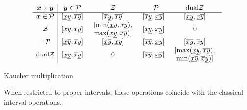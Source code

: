 \documentclass{sig-alternate-05-2015} %
\newcommand{\pro}{\mbox{pro }}
\def\K{{\Bbb I \Bbb K}}
\begin{document}
\begin{table}
\captionsetup{singlelinecheck=off}
\[
\begin{array}{c|cccc}
\x \times \y & \y \in \cal P & \cal Z & - \cal P & \mbox{dual} \cal Z \\
\hline
\x \in \cal P & [\underline x \underline y, \overline x \overline y] & [\overline x \underline y,
\overline x \overline y] & [\overline x \underline y,\underline x \overline y] & 
[\underline x \underline y, \underline x \overline y] \\
\cal Z & [\underline x \overline y, \overline x \overline y] & 
\begin{array}{c}[\min(\underline x \overline y,
\overline x \underline y), \\  \max(\underline x \underline y, \overline x \overline y)]
\end{array}  & 
 [\overline x \underline y, \underline x \underline y]  & 0 \\
 - \cal P & [\underline x \overline y, \overline x \underline y] & [\underline x \overline y,
\underline x \underline y] & [\overline x \overline y, \underline x \underline y] &
[\overline x \overline y, \overline x \underline y] \\
 \mbox{dual} \cal Z  & [\underline x \underline y, \overline x \underline y]  & 0 &
 [\overline x \overline y, \underline x \overline y] & \begin{array}{c}[\max(\underline x \underline y, 
\overline x \overline y), \\  \min(\underline x \overline y, \overline x \underline y)]
\end{array} 
\end{array}
\]
\caption{Kaucher multiplication \label{tabmult}}
\end{table}
When restricted to proper intervals, these operations coincide with the 
classical interval operations. %
\end{document}
